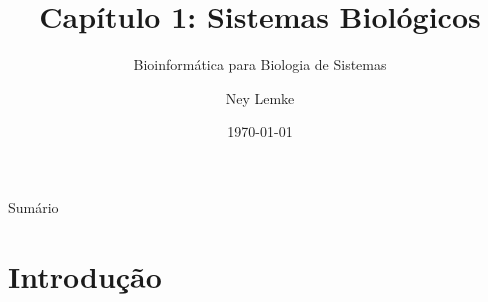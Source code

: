 

\usetikzlibrary{shadows}

\title[Cap. 1: Sistemas Biológicos]{Capítulo 1: Sistemas Biológicos}
\subtitle{Bioinformática para Biologia de Sistemas}
\author{Ney Lemke}
\date{\today}



\begin{frame}
\titlepage
\end{frame}

\begin{frame}{Sumário}
\tableofcontents
\end{frame}

\section{Introdução}

